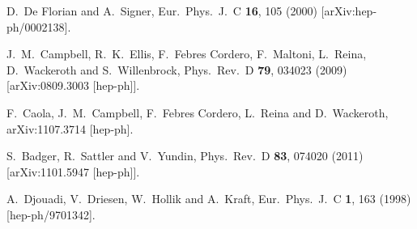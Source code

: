 \documentclass[12pt]{article}
\begin{document}
\begin{thebibliography}{99}
  D.~De Florian and A.~Signer,
  Eur.\ Phys.\ J.\  C {\bf 16}, 105 (2000)
  [arXiv:hep-ph/0002138].

  J.~M.~Campbell, R.~K.~Ellis, F.~Febres Cordero, F.~Maltoni, L.~Reina, D.~Wackeroth and S.~Willenbrock,
  Phys.\ Rev.\  D {\bf 79}, 034023 (2009)
  [arXiv:0809.3003 [hep-ph]].
  
  F.~Caola, J.~M.~Campbell, F.~Febres Cordero, L.~Reina and D.~Wackeroth,
  arXiv:1107.3714 [hep-ph].

  S.~Badger, R.~Sattler and V.~Yundin,
  Phys.\ Rev.\  D {\bf 83}, 074020 (2011)
  [arXiv:1101.5947 [hep-ph]].

  A.~Djouadi, V.~Driesen, W.~Hollik and A.~Kraft,
  Eur.\ Phys.\ J.\ C {\bf 1}, 163 (1998)
  [hep-ph/9701342].

\end{thebibliography}
\end{document}
